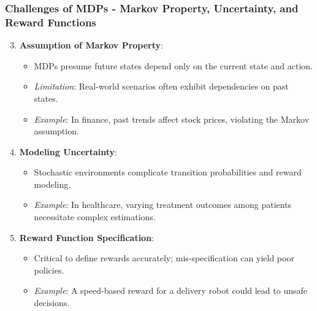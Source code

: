 \documentclass[aspectratio=169]{beamer}
\begin{document}
\begin{frame}[fragile]
    \frametitle{Challenges of MDPs - Markov Property, Uncertainty, and Reward Functions}
    \begin{enumerate}
        \setcounter{enumi}{2}
        \item \textbf{Assumption of Markov Property}:
        \begin{itemize}
            \item MDPs presume future states depend only on the current state and action.
            \item \textit{Limitation}: Real-world scenarios often exhibit dependencies on past states.
            \item \textit{Example}: In finance, past trends affect stock prices, violating the Markov assumption.
        \end{itemize}
        
        \item \textbf{Modeling Uncertainty}:
        \begin{itemize}
            \item Stochastic environments complicate transition probabilities and reward modeling.
            \item \textit{Example}: In healthcare, varying treatment outcomes among patients necessitate complex estimations.
        \end{itemize}
        
        \item \textbf{Reward Function Specification}:
        \begin{itemize}
            \item Critical to define rewards accurately; mis-specification can yield poor policies.
            \item \textit{Example}: A speed-based reward for a delivery robot could lead to unsafe decisions.
        \end{itemize}
    \end{enumerate}
\end{frame}
\end{document}
